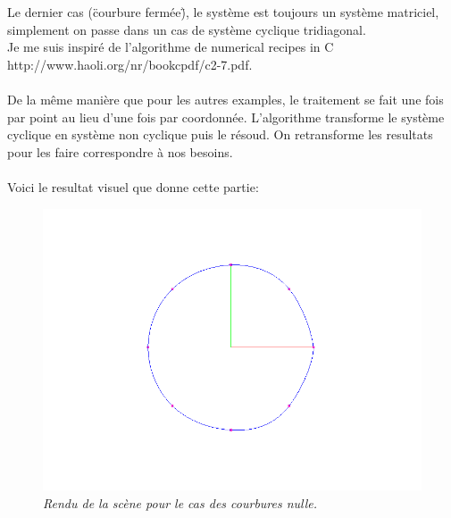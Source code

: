 \documentclass[12pt,letterpaper]{article}
\begin{document}
	Le dernier cas (\"courbure fermée\"), le système est toujours un système matriciel, simplement on passe dans un cas de système cyclique tridiagonal.\\
	Je me suis inspiré de l'algorithme de numerical recipes in C http://www.haoli.org/nr/bookcpdf/c2-7.pdf.\\\\
	De la même manière que pour les autres examples, le traitement se fait une fois par point au lieu d'une fois par coordonnée. L'algorithme transforme le système cyclique en système non cyclique puis le résoud. On retransforme les resultats pour les faire correspondre à nos besoins.\\\\
    Voici le resultat visuel que donne cette partie:
    \begin{figure}[h!]
	\centering
	\includegraphics[scale=0.3]{images/closedcurv.png}
	\caption{\textit{Rendu de la scène pour le cas des courbures nulle.}}
	\end{figure}
\end{document}
